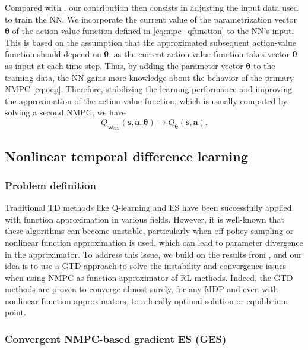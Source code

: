 \documentclass[letterpaper, 10pt, conference]{ieeeconf}
\begin{document}
Compared with \cite{moradimaryamnegari2022model}, our contribution then consists in adjusting the input data used to train the NN.
We incorporate the current value of the parametrization vector $\boldsymbol{\theta}$ of the action-value function defined in \eqref{eq:mpc_qfunction} to the NN's input.
This is based on the assumption that the approximated subsequent action-value function should depend on $\boldsymbol{\theta}$, as the current action-value function takes vector $\boldsymbol{\theta}$ as input at each time step.
Thus, by adding the parameter vector $\boldsymbol{\theta}$ to the training data, the NN gains more knowledge about the behavior of the primary NMPC \eqref{eq:ocp}.
Therefore, stabilizing the learning performance and improving the approximation of the action-value function, which is usually computed by solving a second NMPC, we have
	\begin{equation} \label{eq:nn_convergence}
		Q_{\boldsymbol{\varpi}_{\text{NN}}}(\mathbf{s},\mathbf{a}, \boldsymbol{\theta})  \rightarrow Q_{\boldsymbol{\theta}}\left(\mathbf{s}, \mathbf{a}\right)\text{.}
	\end{equation}

	\subsection{Nonlinear temporal difference learning}
			\label{subsection:GTD}

		\subsubsection{\textbf{Problem definition}}

Traditional TD methods like Q-learning and ES have been successfully applied with function approximation in various fields.
However, it is well-known that these algorithms can become unstable, particularly when off-policy sampling or nonlinear function approximation is used, which can lead to parameter divergence in the approximator.
To address this issue, we build on the results from \cite{maei2009convergent, maei2010toward}, and our idea is to use a GTD approach to solve the instability and convergence issues when using NMPC as function approximator of RL methods.
Indeed, the GTD methods are proven to converge almost surely, for any MDP and even with nonlinear function approximators, to a locally optimal solution or equilibrium point.

		\subsubsection{\textbf{Convergent NMPC-based gradient ES (GES)}}
\end{document}
